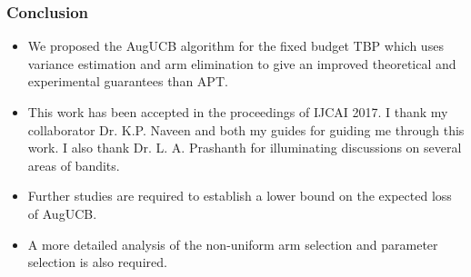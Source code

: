\begin{frame}
\frametitle{Conclusion}
\begin{itemize}
\item<1-> We proposed the AugUCB algorithm for the fixed budget TBP  which uses variance estimation and arm elimination to give an improved theoretical and experimental guarantees than APT.
\item<1-> This work has been accepted in the proceedings of IJCAI 2017. I thank my collaborator Dr. K.P. Naveen and both my guides for guiding me through this work. I also thank Dr. L. A. Prashanth for illuminating discussions on several areas of bandits.
\item<2-> Further studies are required to establish a lower bound on the expected loss of AugUCB.
\item<3-> A more detailed analysis of the non-uniform arm selection and parameter selection is also required.
\end{itemize}
\end{frame}


%
